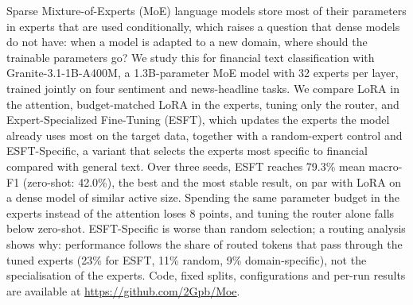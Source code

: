 Sparse Mixture-of-Experts (MoE) language models store most of their parameters in experts
that are used conditionally, which raises a question that dense models do not have: when a
model is adapted to a new domain, where should the trainable parameters go? We study this for
financial text classification with Granite-3.1-1B-A400M, a 1.3B-parameter MoE model with 32
experts per layer, trained jointly on four sentiment and news-headline tasks. We compare LoRA
in the attention, budget-matched LoRA in the experts, tuning only the router, and
Expert-Specialized Fine-Tuning (ESFT), which updates the experts the model already uses most
on the target data, together with a random-expert control and ESFT-Specific, a variant that
selects the experts most specific to financial compared with general text. Over three seeds,
ESFT reaches 79.3\% mean macro-F1 (zero-shot: 42.0\%), the best and the most stable result,
on par with LoRA on a dense model of similar active size. Spending the same parameter budget
in the experts instead of the attention loses 8 points, and tuning the router alone falls
below zero-shot. ESFT-Specific is worse than random selection; a routing analysis shows why:
performance follows the share of routed tokens that pass through the tuned experts
(23\% for ESFT, 11\% random, 9\% domain-specific), not the specialisation of the experts.
Code, fixed splits, configurations and per-run results are available at
\url{https://github.com/2Gpb/Moe}.
